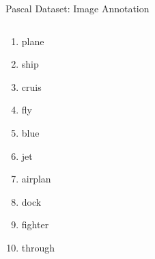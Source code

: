 \documentclass[8pt]{beamer}
\begin{document}
\begin{frame}{Pascal Dataset: Image Annotation}
\begin{columns}[T]
\begin{column}{0.5\textwidth}
\begin{minipage}[t]{0.4\textwidth}
      \begin{enumerate}
      \item plane
      \item ship
      \item cruis
      \item fly
      \item blue
      \item jet
      \item airplan
      \item dock
      \item fighter
      \item through
      \end{enumerate}
    \end{minipage}
  \end{column}
\end{columns}
\end{frame}
\end{document}
